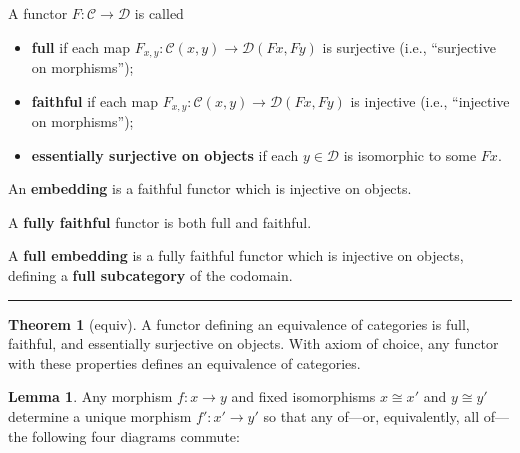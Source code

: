 \documentclass[12pt]{article}
\newcommand{\keyword}[1]{\textbf{#1}}
\newcommand{\sepline}{\rule{\textwidth}{0.4pt}}
\theoremstyle{definition}
\newtheorem{theorem}{Theorem}
\newtheorem{lemma}{Lemma}
\newcommand{\CC}{\mathcal{C}}
\newcommand{\DD}{\mathcal{D}}
\newcommand{\<}{\left\langle}
\renewcommand{\>}{\right\rangle}
\newcommand{\iso}{\cong}
\renewcommand{\_}[1]{{_{#1}}}
\begin{document}
A functor $F : \CC \to \DD$ is called
\begin{itemize}
    \item \keyword{full} if each map $F_{x,y} : \CC(x, y) \to \DD(Fx, Fy)$ is surjective (i.e., ``surjective on morphisms'');
    \item \keyword{faithful} if each map $F_{x,y} : \CC(x, y) \to \DD(Fx, Fy)$ is injective (i.e., ``injective on morphisms'');
    \item \keyword{essentially surjective on objects} if each $y \in \DD$ is isomorphic to some $Fx$.
\end{itemize}

An \keyword{embedding} is a faithful functor which is injective on objects.

A \keyword{fully faithful} functor is both full and faithful.

A \keyword{full embedding} is a fully faithful functor which is injective on objects, defining a \keyword{full subcategory} of the codomain.

\sepline



\begin{theorem}[equiv]
    A functor defining an equivalence of categories is full, faithful, and essentially surjective on objects.
    With axiom of choice, any functor with these properties defines an equivalence of categories.
\end{theorem}

\begin{lemma}
    Any morphism $f : x \to y$ and fixed isomorphisms $x \iso x'$ and $y \iso y'$ determine a unique morphism $f' : x' \to y'$ so that any of---or, equivalently, all of---the following four diagrams commute:
    \begin{center}
        \hspace{1em}
        \hspace{1em}
        \hspace{1em}
    \end{center}
\end{lemma}
\end{document}
